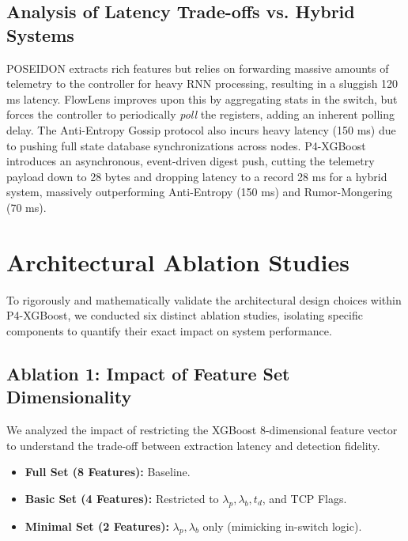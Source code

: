 \documentclass[sigconf, nonacm]{acmart}
\begin{document}
\subsection{Analysis of Latency Trade-offs vs. Hybrid Systems}
POSEIDON extracts rich features but relies on forwarding massive amounts of telemetry to the controller for heavy RNN processing, resulting in a sluggish 120 ms latency. FlowLens improves upon this by aggregating stats in the switch, but forces the controller to periodically \textit{poll} the registers, adding an inherent polling delay. The Anti-Entropy Gossip protocol also incurs heavy latency (150 ms) due to pushing full state database synchronizations across nodes. P4-XGBoost introduces an asynchronous, event-driven digest push, cutting the telemetry payload down to 28 bytes and dropping latency to a record 28 ms for a hybrid system, massively outperforming Anti-Entropy (150 ms) and Rumor-Mongering (70 ms).

\section{Architectural Ablation Studies}

To rigorously and mathematically validate the architectural design choices within P4-XGBoost, we conducted six distinct ablation studies, isolating specific components to quantify their exact impact on system performance.

\subsection{Ablation 1: Impact of Feature Set Dimensionality}
We analyzed the impact of restricting the XGBoost 8-dimensional feature vector to understand the trade-off between extraction latency and detection fidelity.
\begin{itemize}
    \item \textbf{Full Set (8 Features):} Baseline.
    \item \textbf{Basic Set (4 Features):} Restricted to $\lambda_p, \lambda_b, t_d$, and TCP Flags.
    \item \textbf{Minimal Set (2 Features):} $\lambda_p, \lambda_b$ only (mimicking in-switch logic).
\end{itemize}
\end{document}
